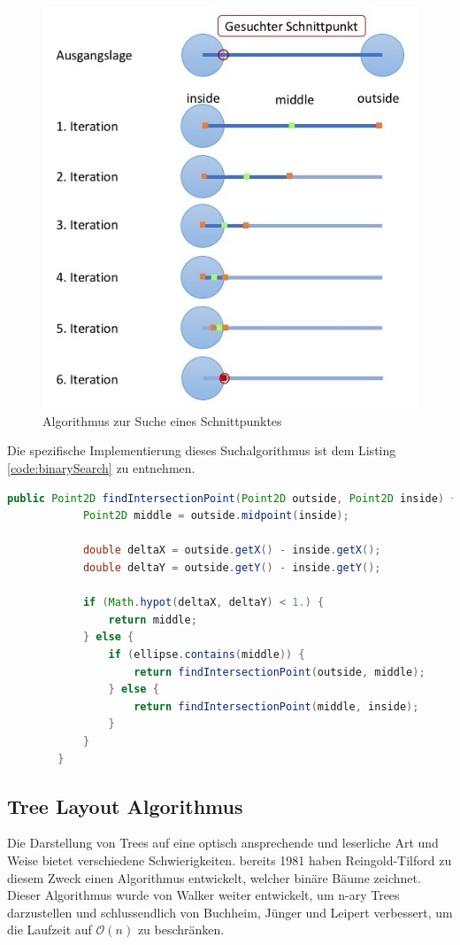 \documentclass[11pt,a4paper,english,oneside]{book}
\numberwithin{equation}{chapter}
\begin{document}
	\begin{figure}
		\centering
		\includegraphics[width=0.7\linewidth]{assets/images/binarySearch}
		\caption{Algorithmus zur Suche eines Schnittpunktes}
		\label{fig:binarySearch}
	\end{figure}
	
	Die spezifische Implementierung dieses Suchalgorithmus ist dem Listing \ref{code:binarySearch} zu entnehmen.
	
	\begin{lstlisting}[language=java, frame=single,caption={Algorithmus Schnittpunkt Suche}, label={code:binarySearch}]
		public Point2D findIntersectionPoint(Point2D outside, Point2D inside) {
			Point2D middle = outside.midpoint(inside);
		
			double deltaX = outside.getX() - inside.getX();
			double deltaY = outside.getY() - inside.getY();
		
			if (Math.hypot(deltaX, deltaY) < 1.) {
				return middle;
			} else {
				if (ellipse.contains(middle)) {
					return findIntersectionPoint(outside, middle);
				} else {
					return findIntersectionPoint(middle, inside);
				}
			}
		}
	\end{lstlisting}


	\subsection{Tree Layout Algorithmus} \label{ssec:treelayouter}

	Die Darstellung von Trees auf eine optisch ansprechende und leserliche Art und Weise bietet verschiedene Schwierigkeiten. bereits 1981 haben Reingold-Tilford \cite{reingold-tilford} zu diesem Zweck einen Algorithmus entwickelt, welcher binäre Bäume zeichnet. Dieser Algorithmus wurde von Walker weiter entwickelt, um n-ary Trees darzustellen und schlussendlich von Buchheim, Jünger und Leipert \cite{tree-algorithm} verbessert, um die Laufzeit auf $\mathcal{O}(n)$ zu beschränken. 
	
\end{document}
